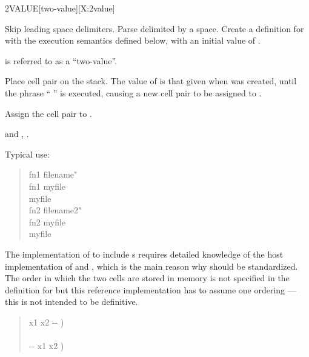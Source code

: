 
\begin{worddef}{}{2VALUE}[two-value][X:2value]
\item {}

	Skip leading space delimiters.  Parse  delimited by a
	space.  Create a definition for  with the execution
	semantics defined below, with an initial value of .

	 is referred to as a ``two-value''.

\execute[name]

	Place cell pair  on the stack.  The value of
	 is that given when  was created,
	until the phrase ``  '' is
	executed, causing a new cell pair  to be assigned
	to .


	Assign the cell pair  to .

\see {} and ,
	.

	\begin{rationale}
		Typical use:
		\begin{quote}\ttfamily
			\word{:} fn1  filename" \word{;} \\
			fn1  myfile \\
			myfile  \\[2ex]
			\word{:} fn2  filename2" \word{;} \\
			fn2  myfile \\
			myfile 
		\end{quote}
	\end{rationale}

	\begin{implement}
		\dffamily
		The implementation of  to include s
		requires detailed knowledge of the host implementation of
		 and , which is the main reason why
		 should be standardized.  The order in which
		the two cells are stored in memory is not specified in the
		definition for  but this reference implementation
		has to assume one ordering --- this is not intended to be
		definitive.

		\begin{quote}\ttfamily
			\word{:}   x1 x2 -{}- ) \\
			\tab {} \word{,} \word{,} \\
			\tab {}   -{}- x1 x2 ) \\
			\word{;}
		\end{quote}


\end{implement}
\end{worddef}
